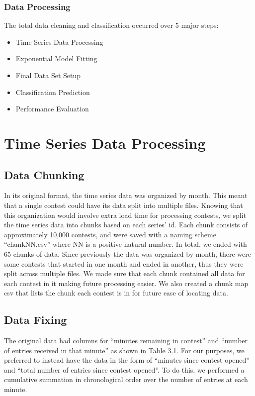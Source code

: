 \subsubsection{Data Processing}

The total data cleaning and classification occurred over 5 major steps:

\begin{itemize}
  \item Time Series Data Processing
  \item Exponential Model Fitting
  \item Final Data Set Setup
  \item Classification Prediction
  \item Performance Evaluation
\end{itemize}

\section{Time Series Data Processing}

\subsection{Data Chunking}

In its original format, the time series data was organized by month. This meant that a single contest could have its data split into multiple files. Knowing that this organization would involve extra load time for processing contests, we split the time series data into chunks based on each series' id. Each chunk consists of approximately 10,000 contests, and were saved with a naming scheme ``chunkNN.csv'' where NN is a positive natural number. In total, we ended with 65 chunks of data. Since previously the data was organized by month, there were some contests that started in one month and ended in another, thus they were split across multiple files. We made sure that each chunk contained all data for each contest in it making future processing easier. We also created a chunk map csv that lists the chunk each contest is in for future ease of locating data.

\subsection{Data Fixing}

The original data had columns for ``minutes remaining in contest'' and ``number of entries received in that minute'' as shown in Table 3.1. For our purposes, we preferred to instead have the data in the form of ``minutes since contest opened'' and ``total number of entries since contest opened''. To do this, we performed a cumulative summation in chronological order over the number of entries at each minute. 


